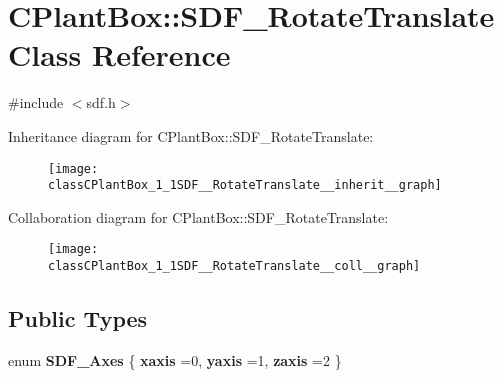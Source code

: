 \hypertarget{classCPlantBox_1_1SDF__RotateTranslate}{}\section{C\+Plant\+Box\+:\+:S\+D\+F\+\_\+\+Rotate\+Translate Class Reference}
\label{classCPlantBox_1_1SDF__RotateTranslate}


{\ttfamily \#include $<$sdf.\+h$>$}



Inheritance diagram for C\+Plant\+Box\+:\+:S\+D\+F\+\_\+\+Rotate\+Translate\+:\nopagebreak
\begin{figure}[H]
\begin{center}
\leavevmode
\texttt{[image: classCPlantBox\_1\_1SDF\_\_RotateTranslate\_\_inherit\_\_graph]}
\end{center}
\end{figure}


Collaboration diagram for C\+Plant\+Box\+:\+:S\+D\+F\+\_\+\+Rotate\+Translate\+:\nopagebreak
\begin{figure}[H]
\begin{center}
\leavevmode
\texttt{[image: classCPlantBox\_1\_1SDF\_\_RotateTranslate\_\_coll\_\_graph]}
\end{center}
\end{figure}
\subsection*{Public Types}
\begin{DoxyCompactItemize}
\item 
\mbox{\label{classCPlantBox_1_1SDF__RotateTranslate_a25d0aa05aef8f8fb9b93553b4672801b}} 
enum {\bfseries S\+D\+F\+\_\+\+Axes} \{ {\bfseries xaxis} =0, 
{\bfseries yaxis} =1, 
{\bfseries zaxis} =2
 \}
\end{DoxyCompactItemize}
